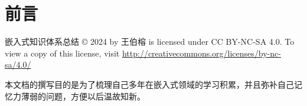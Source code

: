 \chapter*{前言}
%

\begin{minipage}[b]{0.9\textwidth}
\setlength{\parskip}{0.5\baselineskip}
嵌入式知识体系总结  © 2024 by 王伯榕
is licensed under CC BY-NC-SA 4.0.
To view a copy of this license, visit
\url{http://creativecommons.org/licenses/by-nc-sa/4.0/}
\end{minipage}

\vspace*{2\baselineskip}

本文档的撰写目的是为了梳理自己多年在嵌入式领域的学习积累，并且弥补自己记忆力薄弱的问题，方便以后温故知新。
